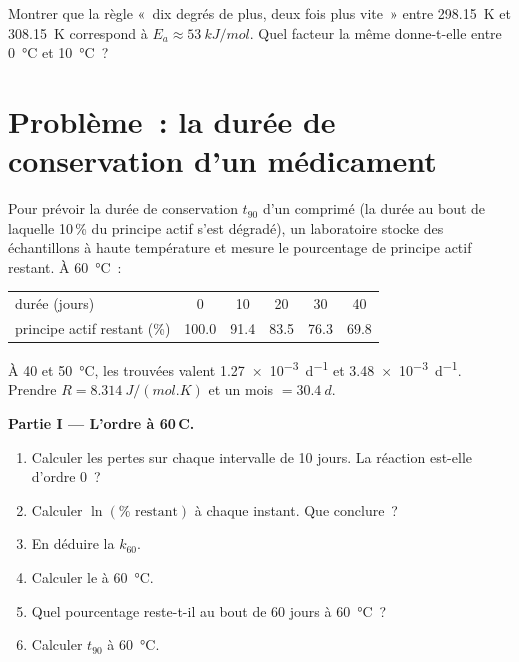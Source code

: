 \begin{exercise}[$\star\star\star$]\label{exo:b1:rate-laws:12}
Montrer que la règle «~dix degrés de plus, deux fois plus vite~» entre
\qty{298.15}{K} et \qty{308.15}{K} correspond à $E_a \approx
\qty{53}{kJ/mol}$. Quel facteur la même  donne-t-elle
entre \qty{0}{\celsius} et \qty{10}{\celsius}~?
\end{exercise}

\section{Problème~: la durée de conservation d'un médicament}

\begin{problem}
\label{pb:b1:rate-laws:1}
Pour prévoir la durée de conservation $t_{90}$ d'un comprimé (la durée
au bout de laquelle 10\,\% du principe actif s'est dégradé), un
laboratoire stocke des échantillons à haute température et mesure le
pourcentage de principe actif restant. À
\qty{60}{\celsius}~:
\begin{center}
\begin{tabular}{lccccc}
\hline
durée (jours) & 0 & 10 & 20 & 30 & 40 \\
principe actif restant (\%) & 100.0 & 91.4 & 83.5 & 76.3 & 69.8 \\
\hline
\end{tabular}
\end{center}
À 40 et \qty{50}{\celsius}, les  trouvées valent
\qty{1.27e-3}{d^{-1}} et \qty{3.48e-3}{d^{-1}}. Prendre $R =
\qty{8.314}{J/(mol.K)}$ et un mois $= \qty{30.4}{d}$.

\medskip
\noindent\textbf{Partie I --- L'ordre à 60\,\textdegree C.}
\begin{enumerate}
  \item Calculer les pertes sur chaque intervalle de 10 jours. La
        réaction est-elle d'ordre 0~?
  \item Calculer $\ln(\%\text{ restant})$ à chaque instant. Que
        conclure~?
  \item En déduire la  $k_{60}$.
  \item Calculer le  à \qty{60}{\celsius}.
  \item Quel pourcentage reste-t-il au bout de 60 jours à
        \qty{60}{\celsius}~?
  \item Calculer $t_{90}$ à \qty{60}{\celsius}.
\end{enumerate}


\end{problem}
